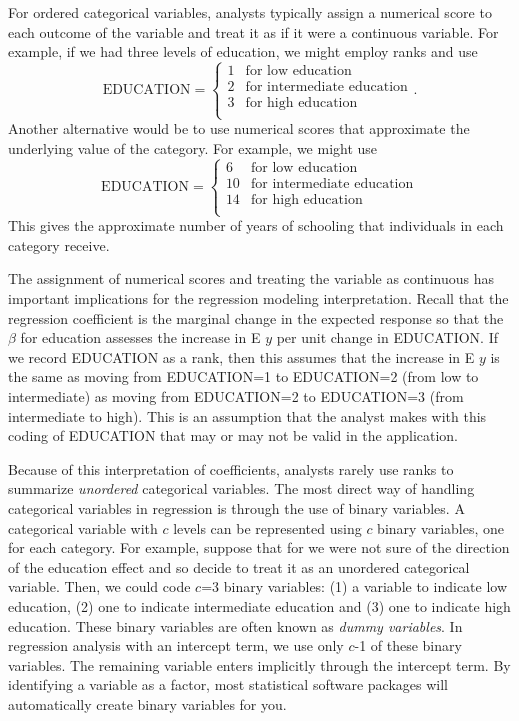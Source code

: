 For ordered categorical variables, analysts typically assign a
numerical score to each outcome of the variable and treat it as if
it were a continuous variable. For example, if we had three levels
of education, we might employ ranks and use
\begin{equation*}
\textrm{EDUCATION} = \left\{ \begin{array}{cl}
        1           & \textrm{for low education} \\
        2           & \textrm{for intermediate education} \\
        3           & \textrm{for high education} \\
\end{array} \right. .
\end{equation*}
Another alternative would be to use numerical scores that
approximate the underlying value of the category. For example, we
might use
\begin{equation*}
\textrm{EDUCATION} = \left\{ \begin{array}{cl}
        6           & \textrm{for low education} \\
        10           & \textrm{for intermediate education} \\
        14           & \textrm{for high education} \\
\end{array} \right.
\end{equation*}
This gives the approximate number of years of schooling that
individuals in each category receive.

The assignment of numerical scores and treating the variable as
continuous has important implications for the regression modeling
interpretation. Recall that the regression coefficient is the
marginal change in the expected response so that the $\beta$ for
education assesses the increase in E $y$ per unit change in
EDUCATION. If we record EDUCATION as a rank, then this assumes that
the increase in E $y$ is the same as moving from EDUCATION=1 to
EDUCATION=2 (from low to intermediate) as moving from EDUCATION=2 to
EDUCATION=3 (from intermediate to high). This is an assumption that
the analyst makes with this coding of EDUCATION that may or may not
be valid in the application.

Because of this interpretation of coefficients, analysts rarely use
ranks to summarize \emph{unordered} categorical variables. The most
direct way of handling categorical variables in regression is
through the use of binary variables. A categorical variable with $c$
levels can be represented using $c$ binary variables, one for each
category. For example, suppose that for we were not sure of the
direction of the education effect and so decide to treat it as an
unordered categorical variable. Then, we could code $c$=3 binary
variables: (1) a variable to indicate low education, (2) one to
indicate intermediate education and (3) one to indicate high
education. These binary variables are often known as \emph{dummy
variables}. In regression analysis with an intercept term, we use
only $c$-1 of these binary variables. The remaining variable enters
implicitly through the intercept term. By identifying a variable as
a factor, most statistical software packages will automatically
create binary variables for you.

